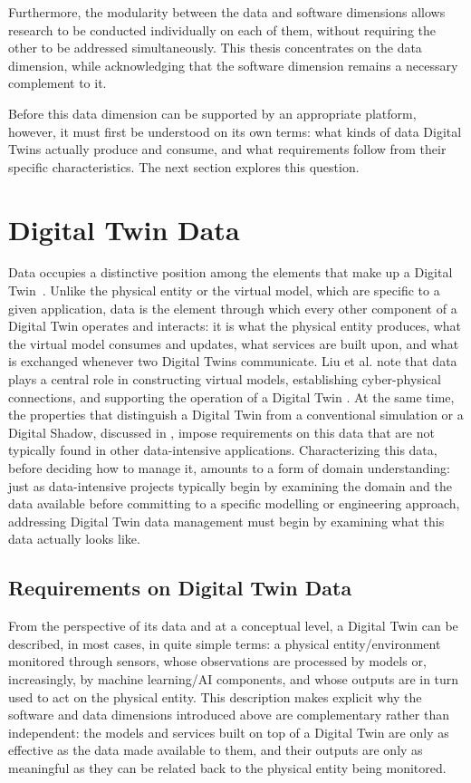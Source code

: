 Furthermore, the modularity between the data and software dimensions allows research to be conducted individually on each of them, without requiring the other to be addressed simultaneously. This thesis concentrates on the data dimension, while acknowledging that the software dimension remains a necessary complement to it.

Before this data dimension can be supported by an appropriate platform, however, it must first be understood on its own terms: what kinds of data Digital Twins actually produce and consume, and what requirements follow from their specific characteristics. The next section explores this question.

\section{Digital Twin Data}
\label{sec:dt_data}

Data occupies a distinctive position among the elements that make up a Digital Twin~\cite{tao2022}. Unlike the physical entity or the virtual model, which are specific to a given application, data is the element through which every other component of a Digital Twin operates and interacts: it is what the physical entity produces, what the virtual model consumes and updates, what services are built upon, and what is exchanged whenever two Digital Twins communicate. Liu et al. note that data plays a central role in constructing virtual models, establishing cyber-physical connections, and supporting the operation of a Digital Twin \cite{liu2022dtd}. At the same time, the properties that distinguish a Digital Twin from a conventional simulation or a Digital Shadow, discussed in , impose requirements on this data that are not typically found in other data-intensive applications. Characterizing this data, before deciding how to manage it, amounts to a form of domain understanding: just as data-intensive projects typically begin by examining the domain and the data available before committing to a specific modelling or engineering approach, addressing Digital Twin data management must begin by examining what this data actually looks like.

\subsection{Requirements on Digital Twin Data}

From the perspective of its data and at a conceptual level, a Digital Twin can be described, in most cases, in quite simple terms: a physical entity/environment monitored through sensors, whose observations are processed by models or, increasingly, by machine learning/AI components, and whose outputs are in turn used to act on the physical entity. This description makes explicit why the software and data dimensions introduced above are complementary rather than independent: the models and services built on top of a Digital Twin are only as effective as the data made available to them, and their outputs are only as meaningful as they can be related back to the physical entity being monitored.

